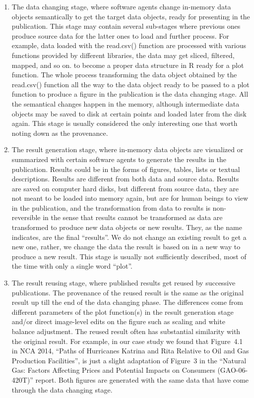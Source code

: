 \begin{enumerate}
	\item The data changing stage, where software agents change in-memory data objects semantically to get the target data objects, ready for presenting in the publication. This stage may contain several sub-stages where previous ones produce source data for the latter ones to load and further process. For example, data loaded with the read.csv() function are processed with various functions provided by different libraries, the data may get sliced, filtered, mapped, and so on. to become a proper data structure in R ready for a plot function. The whole process transforming the data object obtained by the read.csv() function all the way to the data object ready to be passed to a plot function to produce a figure in the publication is the data changing stage. All the semantical changes happen in the memory, although intermediate data objects may be saved to disk at certain points and loaded later from the disk again. This stage is usually considered the only interesting one that worth noting down as the provenance.
	\item The result generation stage, where in-memory data objects are visualized or summarized with certain software agents to generate the results in the publication. Results could be in the forms of figures, tables, lists or textual descriptions. Results are different from both data and source data. Results are saved on computer hard disks, but different from source data, they are not meant to be loaded into memory again, but are for human beings to view in the publication, and the transformation from data to results is non-reversible in the sense that results cannot be transformed as data are transformed to produce new data objects or new results. They, as the name indicates, are the final ``results''. We do not change an existing result to get a new one, rather, we change the data the result is based on in a new way to produce a new result. This stage is usually not sufficiently described, most of the time with only a single word ``plot''.
	\item The result reusing stage, where published results get reused by successive publications. The provenance of the reused result is the same as the original result up till the end of the data changing phase. The differences come from different parameters of the plot function(s) in the result generation stage and/or direct image-level edits on the figure such as scaling and white balance adjustment. The reused result often has substantial similarity with the original result. For example, in our case study we found that Figure~4.1 in NCA 2014, ``Paths of Hurricanes Katrina and Rita Relative to Oil and Gas Production Facilities'', is just a slight adaptation of Figure~3 in the ``Natural Gas: Factors Affecting Prices and Potential Impacts on Consumers (GAO-06-420T)'' report. Both figures are generated with the same data that have come through the data changing stage. 
\end{enumerate}
